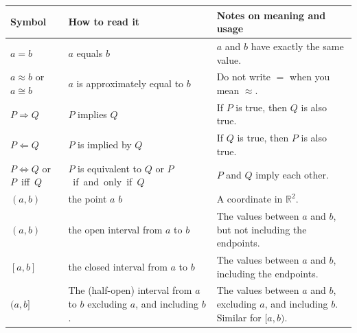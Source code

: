 \renewcommand{\arraystretch}{1.2}
\noindent
\begin{tabular}{|p{0.8in}|p{1.6in}|p{3.15in}|}\hline
  {\bf Symbol} & {\bf How to read it} & {\bf Notes on meaning and usage} \\
  \hline
$ a=b $ &$a$ equals $b$& $a$ and $b$ have exactly the same value.  \\ \hline 
$a \approx b$ or \mbox{$a\cong b$} 
		& $a$ is approximately equal to $b$
			& Do not write $=$ when you mean $\approx$.\\ \hline
$ P\Rightarrow Q$ & $P$ implies $Q$ 
			&  If $P$ is true, then $Q$ is also true.\\ \hline
$ P\Leftarrow Q$ & $P$ is implied by $Q$ 
			&  If $Q$ is true, then $P$ is also true.\\ \hline
$ P\Leftrightarrow Q$ or $P$~iff~$Q$
		& $P$ is equivalent to $Q$ or $P$~if~and~only~if~$Q$
			& $P$ and $Q$ imply each other. \\ \hline 
$ (a,b)$ & the point $a$ $b$ 
		& A coordinate in $\mathbb{R}^2$.  \\ \hline
$ (a,b)$ & the open interval from $a$ to $b$ &
  	The values between $a$ and $b$, but
  	not including the endpoints.  \\ \hline
$ [a,b]$ & the closed interval from $a$ to $b$ &
  	The values between $a$ and $b$, including the endpoints.  \\ \hline 
$ (a,b]$ & The (half-open) interval from $a$ to $b$ excluding $a$, and
  	including $b$. 
		&The values between $a$ and $b$, excluding $a$,
		 and including $b$. Similar for $ [a,b)$. \\ \hline


\end{tabular}
